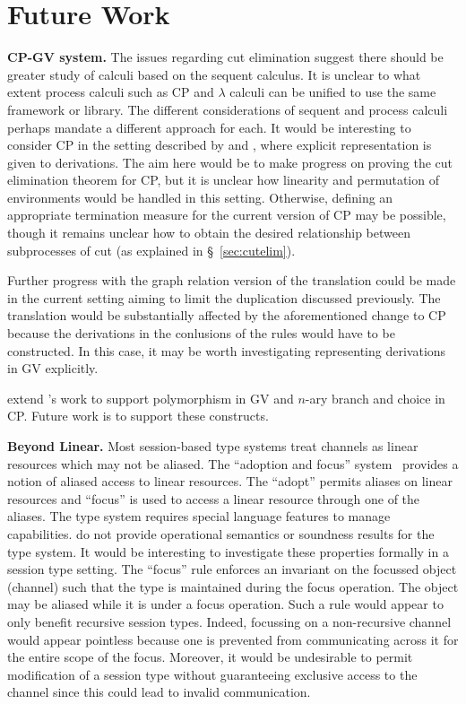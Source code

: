 \section{Future Work}

\textbf{CP-GV system.} The issues regarding cut elimination suggest there
should be greater study of calculi based on the sequent calculus. It is
unclear to what extent process calculi such as CP and $\lambda$ calculi can be
unified to use the same framework or library. The different considerations of
sequent and process calculi perhaps mandate a different approach for each. It
would be interesting to consider CP in the setting described by
\citeauthor{Tews:2013} and \citeauthor{Dawson:2010}, where explicit
representation is given to derivations. The aim here would be to make progress
on proving the cut elimination theorem for CP, but it is unclear how linearity
and permutation of environments would be handled in this setting. Otherwise,
defining an appropriate termination measure for the current version of CP may
be possible, though it remains unclear how to obtain the desired relationship
between subprocesses of cut (as explained in \S~\ref{sec:cutelim}).

Further progress with the graph relation version of the translation could be
made in the current setting aiming to limit the duplication discussed
previously. The translation would be substantially affected by the
aforementioned change to CP because the derivations in the conlusions of the
rules would have to be constructed. In this case, it may be worth
investigating representing derivations in GV explicitly.

\citeauthor{Lindley:2014:SAP} extend \citeauthor{Wadler:2014}'s work to
support polymorphism in GV and $n$-ary branch and choice in CP. Future work is
to support these constructs.

\textbf{Beyond Linear.} Most session-based type systems treat channels as
linear resources which may not be aliased. The ``adoption and focus''
system~\cite{Fahndrich:2002} provides a notion of aliased access to linear
resources. The ``adopt'' permits aliases on linear resources and ``focus'' is
used to access a linear resource through one of the aliases. The type system
requires special language features to manage
capabilities. \citeauthor{Fahndrich:2002} do not provide operational semantics
or soundness results for the type system. It would be interesting to
investigate these properties formally in a session type setting. The ``focus''
rule enforces an invariant on the focussed object (channel) such that the type
is maintained during the focus operation. The object may be aliased while it
is under a focus operation. Such a rule would appear to only benefit recursive
session types. Indeed, focussing on a non-recursive channel would appear
pointless because one is prevented from communicating across it for the entire
scope of the focus. Moreover, it would be undesirable to permit modification
of a session type without guaranteeing exclusive access to the channel since
this could lead to invalid communication.

